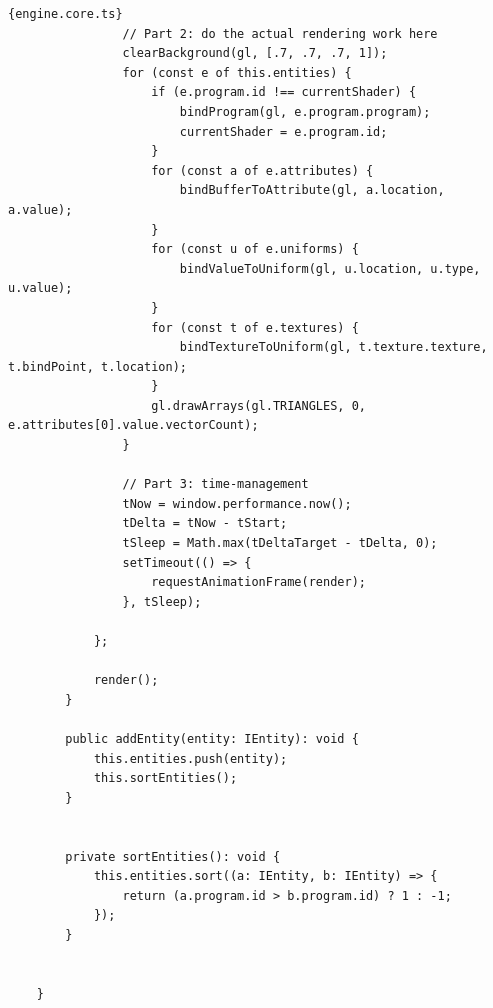 \begin{lstlisting}{engine.core.ts}
                // Part 2: do the actual rendering work here
                clearBackground(gl, [.7, .7, .7, 1]);
                for (const e of this.entities) {
                    if (e.program.id !== currentShader) {
                        bindProgram(gl, e.program.program);
                        currentShader = e.program.id;
                    }
                    for (const a of e.attributes) {
                        bindBufferToAttribute(gl, a.location, a.value);
                    }
                    for (const u of e.uniforms) {
                        bindValueToUniform(gl, u.location, u.type, u.value);
                    }
                    for (const t of e.textures) {
                        bindTextureToUniform(gl, t.texture.texture, t.bindPoint, t.location);
                    }
                    gl.drawArrays(gl.TRIANGLES, 0, e.attributes[0].value.vectorCount);
                }
    
                // Part 3: time-management
                tNow = window.performance.now();
                tDelta = tNow - tStart;
                tSleep = Math.max(tDeltaTarget - tDelta, 0);
                setTimeout(() => {
                    requestAnimationFrame(render);
                }, tSleep);
    
            };
    
            render();
        }
    
        public addEntity(entity: IEntity): void {
            this.entities.push(entity);
            this.sortEntities();
        }
    
    
        private sortEntities(): void {
            this.entities.sort((a: IEntity, b: IEntity) => {
                return (a.program.id > b.program.id) ? 1 : -1;
            });
        }
    
    
    }   
\end{lstlisting}

